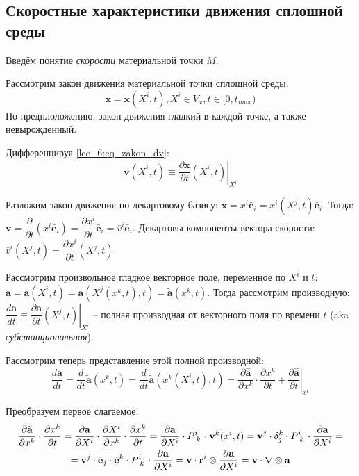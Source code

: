 \subsection{Скоростные характеристики движения сплошной среды}

Введём понятие \emph{скорости} материальной точки $M$.

Рассмотрим закон движения материальной точки сплошной среды:
\begin{equation}\label{lec_6:eq_zakon_dv}
  \mathbf{x} = \mathbf{x} (X^i, t), X^i \in V_{x}, t \in [0, t_{max})
\end{equation}
По предплоложению, закон движения гладкий в каждой точке, а также невырожденный.

Дифференцируя \eqref{lec_6:eq_zakon_dv}:
\[
  \mathbf{v}(X^i, t) \equiv \left. \dfrac{\partial \mathbf{x}}{\partial t} (X^i, t) \right|_{X^i}
\]

Разложим закон движения по декартовому базису:
$\mathbf{x} = x^i \bar{\mathbf{e}}_i = x^i(X^j, t) \bar{\mathbf{e}}_i$.
Тогда: $\mathbf{v} = \dfrac{\partial }{\partial t} \left( x^i \bar{\mathbf{e}}_i \right) 
  = \dfrac{\partial x^i}{\partial t} \bar{\mathbf{e}}_i = \bar{v}^i \bar{\mathbf{e}}_i$.
Декартовы компоненты вектора скорости:
$\bar{v}^i (X^j, t) = \dfrac{\partial x^i}{\partial t} (X^j, t)$.

Рассмотрим произвольное гладкое векторное поле, переменное по $X^i$ и $t$:
$\mathbf{a} = \mathbf{a}(X^i, t) = \mathbf{a}(X^j(x^k, t), t) = \tilde{\mathbf{a}} (x^k, t)$.
Тогда рассмотрим производную:
$ \dfrac{d\mathbf{a}}{dt} \equiv \left.\dfrac{\partial \mathbf{a}}{\partial t} (X^j, t) \right|_{X^i}$ -- полная производная от векторного поля по времени $t$ (aka \emph{субстанциональная}).

Рассмотрим теперь представление этой полной производной:
\[
  \dfrac{d\mathbf{a}}{dt} = \dfrac{d}{dt} \tilde{\mathbf{a}}(x^k, t)
  = \dfrac{d}{dt} \tilde{\mathbf{a}} (x^k(X^i, t), t)
  = \dfrac{\partial \hat{\mathbf{a}}}{\partial x^k} \cdot \dfrac{\partial x^k}{\partial t}
  + \left. \dfrac{\partial \hat{\mathbf{a}}}{\partial t} \right|_{x^k}
\]

Преобразуем первое слагаемое:
\begin{multline*}
  \dfrac{\partial \tilde{\mathbf{a}}}{\partial x^k} \cdot \dfrac{\partial x^k}{\partial t} 
  = \dfrac{\partial \mathbf{a}}{\partial X^i} \cdot \dfrac{\partial X^i}{\partial x^k} \cdot \dfrac{\partial x^k}{\partial t}
  = \dfrac{\partial \mathbf{a}}{\partial X^i} \cdot \tensor{P}{^i_k} \cdot \mathbf{v}^k (x^i, t)
  = \mathbf{v}^j \cdot \delta^k_j \cdot \tensor{P}{^i_k} \cdot \dfrac{\partial \mathbf{a}}{\partial X^i} = \\
  = \mathbf{v}^j \cdot \bar{\mathbf{e}}_j \cdot \bar{\mathbf{e}}^k \cdot \tensor{P}{^i_k} \cdot \dfrac{\partial \mathbf{a}}{\partial X^i}
  = \mathbf{v} \cdot \mathbf{r}^i \otimes \dfrac{\partial \mathbf{a}}{\partial X^i} 
  = \mathbf{v} \cdot \nabla \otimes \mathbf{a}
\end{multline*}

